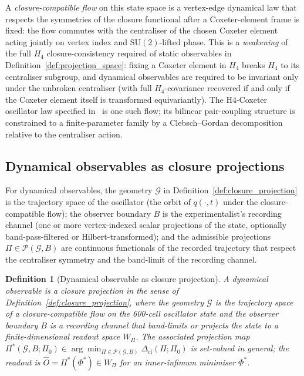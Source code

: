 \documentclass[12pt]{article}
\newtheorem{definition}[theorem]{Definition}
\newcommand{\Pcal}{\mathcal{P}}
\newcommand{\Gcal}{\mathcal{G}}
\newcommand{\Dcl}{\Delta_{\mathrm{cl}}}
\begin{document}
A \emph{closure-compatible flow} on this state space is a vertex-edge dynamical law that respects the symmetries of the closure functional after a Coxeter-element frame is fixed: the flow commutes with the centraliser of the chosen Coxeter element acting jointly on vertex index and $\mathrm{SU}(2)$-lifted phase. This is a \emph{weakening} of the full $H_4$ closure-consistency required of static observables in Definition~\ref{def:projection_space}: fixing a Coxeter element in $H_4$ breaks $H_4$ to its centraliser subgroup, and dynamical observables are required to be invariant only under the unbroken centraliser (with full $H_4$-covariance recovered if and only if the Coxeter element itself is transformed equivariantly). The H4-Coxeter oscillator law specified in~\citep{H4Coxeter2026} is one such flow; its bilinear pair-coupling structure is constrained to a finite-parameter family by a Clebsch--Gordan decomposition relative to the centraliser action.

\subsection{Dynamical observables as closure projections}\label{subsec:dynamical_proj}

For dynamical observables, the geometry $\Gcal$ in Definition~\ref{def:closure_projection} is the trajectory space of the oscillator (the orbit of $q(\cdot, t)$ under the closure-compatible flow); the observer boundary $B$ is the experimentalist's recording channel (one or more vertex-indexed scalar projections of the state, optionally band-pass-filtered or Hilbert-transformed); and the admissible projections $\Pi \in \Pcal(\Gcal, B)$ are continuous functionals of the recorded trajectory that respect the centraliser symmetry and the band-limit of the recording channel.

\begin{definition}[Dynamical observable as closure projection]\label{def:dynamical_obs}
A \emph{dynamical observable} is a closure projection in the sense of Definition~\ref{def:closure_projection}, where the geometry $\Gcal$ is the trajectory space of a closure-compatible flow on the 600-cell oscillator state and the observer boundary $B$ is a recording channel that band-limits or projects the state to a finite-dimensional readout space $W_\Pi$. The associated projection map $\Pi^*(\Gcal, B; \Pi_0) \in \arg\min_{\Pi \in \Pcal(\Gcal, B)} \Dcl(\Pi;\Pi_0)$ is set-valued in general; the readout is $\hat{O} = \Pi^*(\Phi^*) \in W_\Pi$ for an inner-infimum minimiser $\Phi^*$.
\end{definition}
\end{document}
